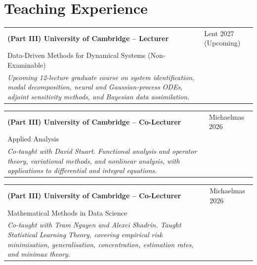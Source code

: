 \documentclass[a4paper,10pt]{article}
\newcommand{\faPaperclip}{{\ResumeLinkFont\symbol{"F0C6}}}
\begin{document}
\section*{Teaching Experience}
\begin{tabularx}{\textwidth}{@{}X|>{\raggedleft\arraybackslash}p{2.2cm}@{}}
\textbf{(Part III) University of Cambridge -- Lecturer} \href{\detokenize{https://www.maths.cam.ac.uk/postgrad/part-iii/files/GtC/Applied}\%\detokenize{20and}\%\detokenize{20computstional}\%\detokenize{20analysis/datadrivendynamics_stepaniants.pdf}}{\faPaperclip} & Lent 2027 (Upcoming)\\[2pt]
Data-Driven Methods for Dynamical Systems (Non-Examinable)\\
\textit{Upcoming 12-lecture graduate course on system identification, modal decomposition, neural and Gaussian-process ODEs, adjoint sensitivity methods, and Bayesian data assimilation.}
\end{tabularx}
\vspace{10pt}

\begin{tabularx}{\textwidth}{@{}X|>{\raggedleft\arraybackslash}p{2.2cm}@{}}
\textbf{(Part III) University of Cambridge -- Co-Lecturer} \href{\detokenize{https://www.maths.cam.ac.uk/postgrad/part-iii/files/GtC/Applied}\%\detokenize{20and}\%\detokenize{20computstional}\%\detokenize{20analysis/AppliedAnalysis_Stuart.pdf}}{\faPaperclip} & Michaelmas 2026\\[2pt]
Applied Analysis\\
\textit{Co-taught with David Stuart. Functional analysis and operator theory, variational methods, and nonlinear analysis, with applications to differential and integral equations.}
\end{tabularx}
\vspace{10pt}

\begin{tabularx}{\textwidth}{@{}X|>{\raggedleft\arraybackslash}p{2.2cm}@{}}
\textbf{(Part III) University of Cambridge -- Co-Lecturer} \href{\detokenize{https://www.maths.cam.ac.uk/postgrad/part-iii/files/GtC/Applied}\%\detokenize{20and}\%\detokenize{20computstional}\%\detokenize{20analysis/mathmethodsdatascience_stepaniants.pdf}}{\faPaperclip} & Michaelmas 2026\\[2pt]
Mathematical Methods in Data Science\\
\textit{Co-taught with Tram Nguyen and Alexei Shadrin. Taught Statistical Learning Theory, covering empirical risk minimisation, generalisation, concentration, estimation rates, and minimax theory.}
\end{tabularx}
\vspace{10pt}
\end{document}
